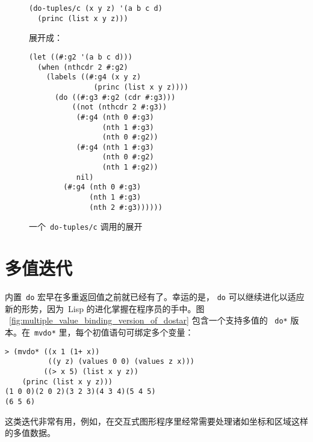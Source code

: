 \begin{figure}
\begin{lstlisting}
(do-tuples/c (x y z) '(a b c d)
  (princ (list x y z)))
\end{lstlisting}
展开成：
\begin{lstlisting}
(let ((#:g2 '(a b c d)))
  (when (nthcdr 2 #:g2)
    (labels ((#:g4 (x y z)
               (princ (list x y z))))
      (do ((#:g3 #:g2 (cdr #:g3)))
          ((not (nthcdr 2 #:g3))
           (#:g4 (nth 0 #:g3)
                 (nth 1 #:g3)
                 (nth 0 #:g2))
           (#:g4 (nth 1 #:g3)
                 (nth 0 #:g2)
                 (nth 1 #:g2))
           nil)
        (#:g4 (nth 0 #:g3)
              (nth 1 #:g3)
              (nth 2 #:g3))))))
\end{lstlisting}
  \caption{一个~\texttt{do-tuples/c} 调用的展开}
  \label{fig:expansion_of_a_call_to_do-tuples_c}
\end{figure}

\section{多值迭代}
\label{sec:iteration_with_multiple_values}

内置~\verb|do| 宏早在多重返回值之前就已经有了。幸运的是，
\texttt{do} 可以继续进化以适应新的形势，因为~Lisp 的进化掌握在程序员的手中。图
~\ref{fig:multiple_value_binding_version_of_dostar} 包含一个支持多值的
~\texttt{do*} 版本。在~\texttt{mvdo*} 里，每个初值语句可绑定多个变量：
\begin{lstlisting}
> (mvdo* ((x 1 (1+ x))
          ((y z) (values 0 0) (values z x)))
         ((> x 5) (list x y z))
    (princ (list x y z)))
(1 0 0)(2 0 2)(3 2 3)(4 3 4)(5 4 5)
(6 5 6)
\end{lstlisting}
这类迭代非常有用，例如，在交互式图形程序里经常需要处理诸如坐标和区域这样的多值数据。

